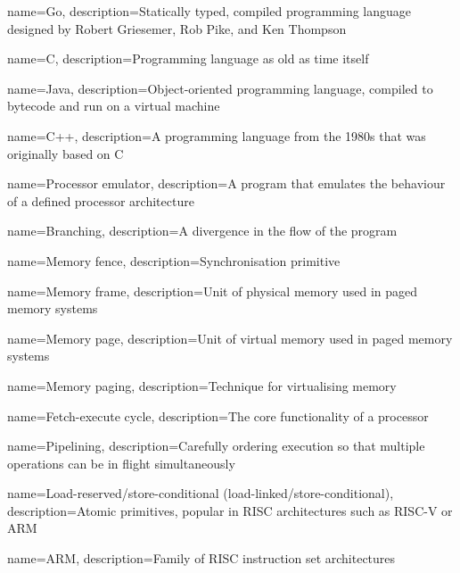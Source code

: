 
 {
    name=Go,
    description={Statically typed, compiled programming language designed by Robert Griesemer, Rob Pike, and Ken Thompson}
}

 {
    name=C,
    description={Programming language as old as time itself}
}

 {
    name=Java,
    description={Object-oriented programming language, compiled to bytecode and run on a virtual machine}
}

 {
    name=C++,
    description={A programming language from the 1980s that was originally based on C}
}

 {
    name=Processor emulator,
    description={A program that emulates the behaviour of a defined processor architecture}
}

 {
    name=Branching,
    description={A divergence in the flow of the program}
}

 {
    name=Memory fence,
    description={Synchronisation primitive}
}

 {
    name=Memory frame,
    description={Unit of physical memory used in paged memory systems}
}

 {
    name=Memory page,
    description={Unit of virtual memory used in paged memory systems}
}

 {
    name=Memory paging,
    description={Technique for virtualising memory}
}

 {
    name=Fetch-execute cycle,
    description={The core functionality of a processor}
}

 {
    name=Pipelining,
    description={Carefully ordering execution so that multiple operations can be in flight simultaneously}
}

 {
    name=Load-reserved/store-conditional (load-linked/store-conditional),
    description={Atomic primitives, popular in RISC architectures such as RISC-V or ARM}
}

 {
    name=ARM,
    description={Family of RISC instruction set architectures}
}

